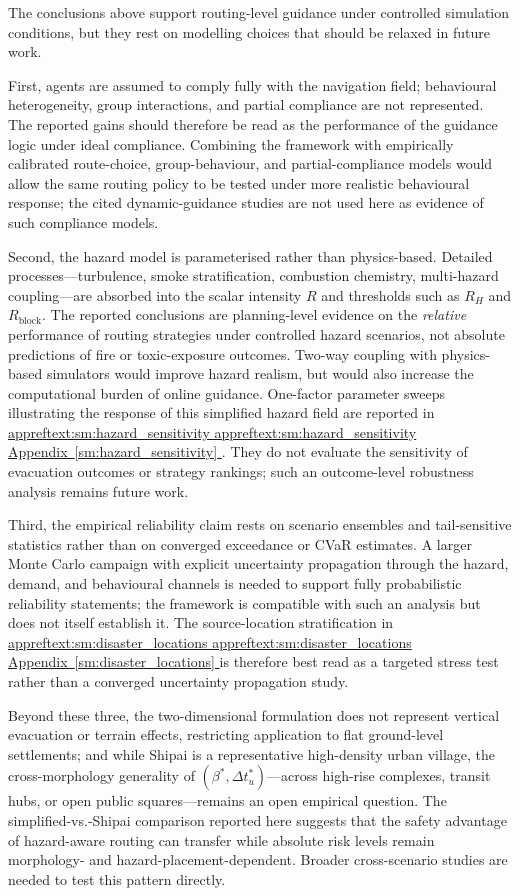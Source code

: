 \documentclass[preprint,12pt]{elsarticle}
\DeclareRobustCommand{\appref}[1]{%
  \hyperref[#1]{%
    \ifcsname appreftext:#1\endcsname%
      \csname appreftext:#1\endcsname%
    \else%
      Appendix~\ref*{#1}%
    \fi%
  }%
}
\begin{document}
The conclusions above support routing-level guidance under controlled
simulation conditions, but they rest on modelling choices that should be
relaxed in future work.

First, agents are assumed to comply fully with the navigation field;
behavioural heterogeneity, group interactions, and partial compliance
are not represented. The reported gains should therefore be read as the
performance of the guidance logic under ideal compliance. Combining the
framework with empirically calibrated route-choice, group-behaviour, and
partial-compliance models would allow the same routing policy to be tested
under more realistic behavioural response; the cited dynamic-guidance
studies are not used here as evidence of such compliance models.

Second, the hazard model is parameterised rather than physics-based.
Detailed processes---turbulence, smoke stratification, combustion
chemistry, multi-hazard coupling---are absorbed into the scalar
intensity $R$ and thresholds such as $R_H$ and
$R_{\mathrm{block}}$. The reported conclusions are
planning-level evidence on the \emph{relative} performance of routing
strategies under controlled hazard scenarios, not absolute predictions
of fire or toxic-exposure outcomes. Two-way coupling with physics-based
simulators would improve hazard realism, but would also increase the
computational burden of online guidance.
One-factor parameter sweeps illustrating the response of this simplified
hazard field are reported in \appref{sm:hazard_sensitivity}. They do not
evaluate the sensitivity of evacuation outcomes or strategy rankings;
such an outcome-level robustness analysis remains future work.

Third, the empirical reliability claim rests on scenario ensembles and
tail-sensitive statistics rather than on converged exceedance or CVaR
estimates. A larger Monte Carlo campaign with explicit uncertainty
propagation through the hazard, demand, and behavioural channels is
needed to support fully probabilistic reliability statements; the
framework is compatible with such an analysis but does not itself
establish it. The source-location stratification in
\appref{sm:disaster_locations} is therefore best read as a targeted
stress test rather than a converged uncertainty propagation study.

Beyond these three, the two-dimensional formulation does not represent
vertical evacuation or terrain effects, restricting application to flat
ground-level settlements; and while Shipai is a representative
high-density urban village, the cross-morphology generality of
$(\beta^{*}, \Delta t_u^{*})$---across high-rise complexes, transit
hubs, or open public squares---remains an open empirical question. The
simplified-vs.-Shipai comparison reported here suggests that the
safety advantage of hazard-aware routing can transfer while absolute
risk levels remain morphology- and hazard-placement-dependent. Broader
cross-scenario studies are needed to test this pattern directly.
\end{document}

